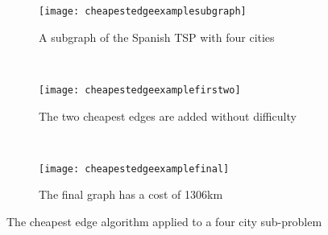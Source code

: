 \begin{figure}[h]\centering
    \begin{subfigure}[b]{0.3\textwidth}
        \texttt{[image: cheapestedgeexamplesubgraph]}
        \caption{A subgraph of the Spanish TSP  with four cities}
        \label{fig:examplesubgraph}
    \end{subfigure}
    ~ %
    \begin{subfigure}[b]{0.3\textwidth}
        \texttt{[image: cheapestedgeexamplefirstwo]}
        \caption{The two cheapest edges are added without difficulty}
        \label{fig:examplefirstwo}
    \end{subfigure}
    ~ %
    \begin{subfigure}[b]{0.3\textwidth}
        \texttt{[image: cheapestedgeexamplefinal]}
        \caption{The final graph has a cost of 1306km}
        \label{fig:examplefinal}
    \end{subfigure}
    \caption{The cheapest edge algorithm applied to a four city sub-problem}\label{fig:cheapestedgeexample}
\end{figure}



